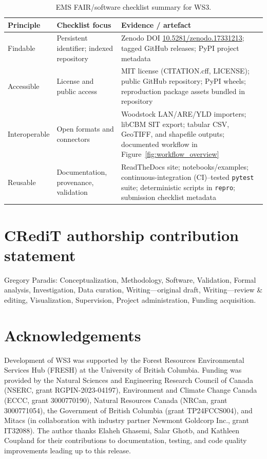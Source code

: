 \documentclass[review]{elsarticle}
\begin{document}
\begin{table}[h]
  \centering
  \caption{EMS FAIR/software checklist summary for WS3.}
  \label{tab:fair-checklist}
  \footnotesize
  \begin{tabular}{p{2.1cm}p{3.4cm}p{6.1cm}}
    \toprule
    Principle & Checklist focus & Evidence / artefact \\
    \midrule
    Findable & Persistent identifier; indexed repository & Zenodo DOI \href{https://doi.org/10.5281/zenodo.17331213}{10.5281/zenodo.17331213}; tagged GitHub releases; PyPI project metadata \\
    Accessible & License and public access & MIT license (CITATION.cff, LICENSE); public GitHub repository; PyPI wheels; reproduction package assets bundled in repository \\
    Interoperable & Open formats and connectors & Woodstock LAN/ARE/YLD importers; libCBM SIT export; tabular CSV, GeoTIFF, and shapefile outputs; documented workflow in Figure~\ref{fig:workflow_overview} \\
    Reusable & Documentation, provenance, validation & ReadTheDocs site; notebooks/examples; continuous-integration (CI)–tested \texttt{pytest} suite; deterministic scripts in \texttt{repro}; submission checklist metadata \\
    \bottomrule
  \end{tabular}
\end{table}

\section*{CRediT authorship contribution statement}
Gregory Paradis: Conceptualization, Methodology, Software, Validation, Formal analysis, Investigation, Data curation, Writing—original draft, Writing—review \& editing, Visualization, Supervision, Project administration, Funding acquisition.

\section*{Acknowledgements}
Development of WS3 was supported by the Forest Resources Environmental Services Hub (FRESH) at the University of British Columbia. Funding was provided by the Natural Sciences and Engineering Research Council of Canada (NSERC, grant RGPIN-2023-04197), Environment and Climate Change Canada (ECCC, grant 3000770190), Natural Resources Canada (NRCan, grant 3000771054), the Government of British Columbia (grant TP24FCCS004), and Mitacs (in collaboration with industry partner Newmont Goldcorp Inc., grant IT32088). The author thanks Elaheh Ghasemi, Salar Ghotb, and Kathleen Coupland for their contributions to documentation, testing, and code quality improvements leading up to this release.
\end{document}
